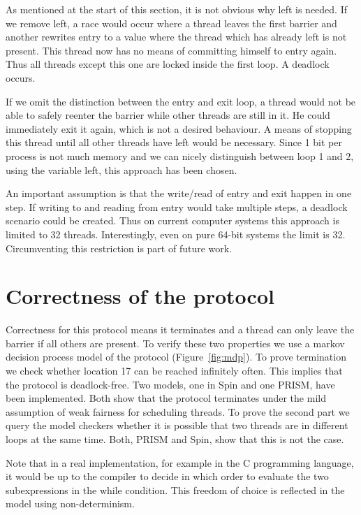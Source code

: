 \documentclass[a4paper, 10pt]{article}
\begin{document}
As mentioned at the start of this section, it is not obvious why left is needed. If we remove left, a race would occur where a thread leaves the first barrier and another rewrites entry to a value where the thread which has already left is not present. This thread now has no means of committing himself to entry again. Thus all threads except this one are locked inside the first loop. A deadlock occurs.

If we omit the distinction between the entry and exit loop, a thread would not be able to safely reenter the barrier while other threads are still in it. He could immediately exit it again, which is not a desired behaviour. A means of stopping this thread until all other threads have left would be necessary. Since 1 bit per process is not much memory and we can nicely distinguish between loop 1 and 2, using the variable left, this approach has been chosen.

An important assumption is that the write/read of entry and exit happen in one step. If writing to and reading from entry would take multiple steps, a deadlock scenario could be created. Thus on current computer systems this approach is limited to 32 threads. Interestingly, even on pure 64-bit systems the limit is 32. Circumventing this restriction is part of future work.

\section{Correctness of the protocol}
\label{sec:correctness}
Correctness for this protocol means it terminates and a thread can only leave the barrier if all others are present. To verify these two properties we use a markov decision process model of the protocol (Figure~\ref{fig:mdp}). To prove termination we check whether location 17 can be reached infinitely often. This implies that the protocol is deadlock-free. Two models, one in Spin\cite{spin} and one PRISM\cite{prism}, have been implemented. Both show that the protocol terminates under the mild assumption of weak fairness for scheduling threads. To prove the second part we query the model checkers whether it is possible that two threads are in different loops at the same time. Both, PRISM and Spin, show that this is not the case.

Note that in a real implementation, for example in the C programming language, it would be up to the compiler to decide in which order to evaluate the two subexpressions in the while condition. This freedom of choice is reflected in the model using non-determinism.
\end{document}
